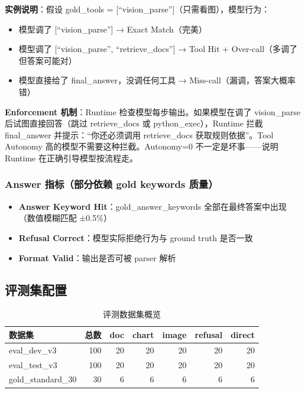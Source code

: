 \documentclass[12pt,a4paper]{ctexart}
\begin{document}
\textbf{实例说明}：假设 gold\_tools = [``vision\_parse'']（只需看图），模型行为：
\begin{itemize}[nosep]
  \item 模型调了 [``vision\_parse''] → Exact Match（完美）
  \item 模型调了 [``vision\_parse'', ``retrieve\_docs''] → Tool Hit + Over-call（多调了但答案可能对）
  \item 模型直接给了 final\_answer，没调任何工具 → Miss-call（漏调，答案大概率错）
\end{itemize}

\textbf{Enforcement 机制}：Runtime 检查模型每步输出。如果模型在调了 vision\_parse 后试图直接回答（跳过 retrieve\_docs 或 python\_exec），Runtime 拦截 final\_answer 并提示：``你还必须调用 retrieve\_docs 获取规则依据''。Tool Autonomy 高的模型不需要这种拦截。Autonomy=0 不一定是坏事——说明 Runtime 在正确引导模型按流程走。

\subsubsection{Answer 指标（部分依赖 gold keywords 质量）}

\begin{itemize}[nosep]
  \item \textbf{Answer Keyword Hit}：gold\_answer\_keywords 全部在最终答案中出现（数值模糊匹配 ±0.5\%）
  \item \textbf{Refusal Correct}：模型实际拒绝行为与 ground truth 是否一致
  \item \textbf{Format Valid}：输出是否可被 parser 解析
\end{itemize}

\subsection{评测集配置}

\begin{table}[H]
\centering
\caption{评测数据集概览}
\begin{tabular}{lrrrrrr}
\toprule
数据集 & 总数 & doc & chart & image & refusal & direct \\
\midrule
eval\_dev\_v3 & 100 & 20 & 20 & 20 & 20 & 20 \\
eval\_test\_v3 & 100 & 20 & 20 & 20 & 20 & 20 \\
gold\_standard\_30 & 30 & 6 & 6 & 6 & 6 & 6 \\
\bottomrule
\end{tabular}
\end{table}
\end{document}
